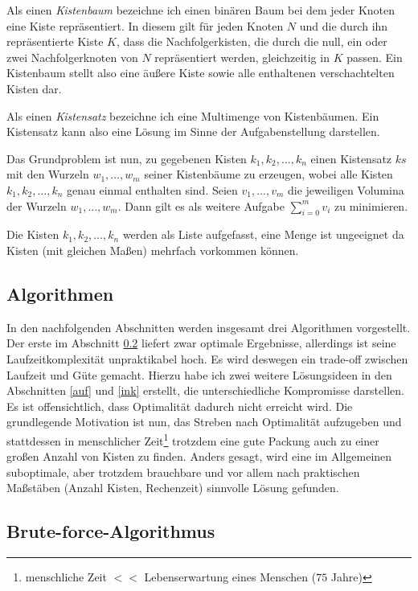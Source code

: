  Als einen \emph{Kistenbaum} bezeichne ich einen binären Baum bei dem jeder Knoten eine Kiste repräsentiert.
 In diesem gilt für jeden Knoten $N$ und die durch ihn repräsentierte Kiste $K$, dass die Nachfolgerkisten,
 die durch die null, ein oder zwei Nachfolgerknoten von $N$ repräsentiert werden, gleichzeitig in $K$ passen.
 Ein Kistenbaum stellt also eine äußere Kiste sowie alle enthaltenen verschachtelten Kisten dar.

 Als einen \emph{Kistensatz} bezeichne ich eine Multimenge von Kistenbäumen.
 Ein Kistensatz kann also eine Lösung im Sinne der Aufgabenstellung darstellen.

 Das Grundproblem ist nun, zu gegebenen Kisten $k_1,k_2,\dots,k_n$
 einen Kistensatz $ks$ mit den Wurzeln $w_1,\dots,w_m$ seiner Kistenbäume zu erzeugen, wobei alle Kisten $k_1,k_2,\dots,k_n$ genau einmal enthalten sind.
 Seien $v_1,\dots,v_m$ die jeweiligen Volumina der Wurzeln $w_1,\dots,w_m$. Dann gilt es als weitere Aufgabe $\sum_{i=0}^{m}{v_i}$ zu minimieren.

 Die Kisten $k_1,k_2,\dots,k_n$ werden als Liste aufgefasst, eine Menge ist ungeeignet da Kisten (mit gleichen Maßen) mehrfach vorkommen können.
\subsection{Algorithmen}
 In den nachfolgenden Abschnitten werden insgesamt drei Algorithmen vorgestellt.
 Der erste im Abschnitt \ref{bruteforce} liefert zwar optimale Ergebnisse, allerdings ist seine Laufzeitkomplexität unpraktikabel hoch.
 Es wird deswegen ein trade-off zwischen Laufzeit und Güte gemacht.
 Hierzu habe ich zwei weitere Lösungsideen in den Abschnitten \ref{auf} und \ref{ink} erstellt, die unterschiedliche Kompromisse darstellen.
 Es ist offensichtlich, dass Optimalität dadurch nicht erreicht wird.
 Die grundlegende Motivation ist nun,
 das Streben nach Optimalität aufzugeben und stattdessen in menschlicher Zeit\footnote{menschliche Zeit $<<$ Lebenserwartung eines Menschen ($75$ Jahre)}
  trotzdem eine gute Packung auch zu einer großen Anzahl von Kisten zu finden.
 Anders gesagt, wird eine im Allgemeinen suboptimale, aber trotzdem brauchbare und vor allem nach praktischen Maßstäben (Anzahl Kisten, Rechenzeit) sinnvolle Lösung gefunden.
\subsection{Brute-force-Algorithmus}
\label{bruteforce}
